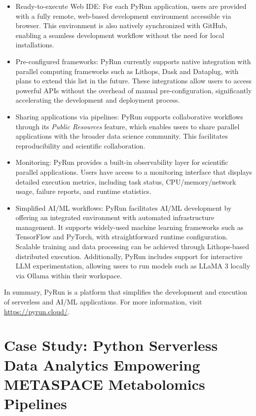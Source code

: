 \begin{itemize}

\item Ready-to-execute Web IDE: For each PyRun application, users are provided with a fully remote, web-based development environment accessible via browser. This environment is also natively synchronized with GitHub, enabling a seamless development workflow without the need for local installations.

\item Pre-configured frameworks: PyRun currently supports native integration with parallel computing frameworks such as Lithops, Dask and Dataplug, with plans to extend this list in the future. These integrations allow users to access powerful APIs without the overhead of manual pre-configuration, significantly accelerating the development and deployment process.

\item Sharing applications via pipelines: PyRun supports collaborative workflows through its \textit{Public Resources} feature, which enables users to share parallel applications with the broader data science community. This facilitates reproducibility and scientific collaboration.

\item Monitoring: PyRun provides a built-in observability layer for scientific parallel applications. Users have access to a monitoring interface that displays detailed execution metrics, including task status, CPU/memory/network usage, failure reports, and runtime statistics.

\item Simplified AI/ML workflows: PyRun facilitates AI/ML development by offering an integrated environment with automated infrastructure management. It supports widely-used machine learning frameworks such as TensorFlow and PyTorch, with straightforward runtime configuration. Scalable training and data processing can be achieved through Lithops-based distributed execution. Additionally, PyRun includes support for interactive LLM experimentation, allowing users to run models such as LLaMA 3 locally via Ollama within their workspace.
\end{itemize}

In summary, PyRun is a platform that simplifies the development and execution of serverless and AI/ML applications. For more information, visit \url{https://pyrun.cloud/}.


\section{Case Study: Python Serverless Data Analytics Empowering METASPACE Metabolomics Pipelines}

